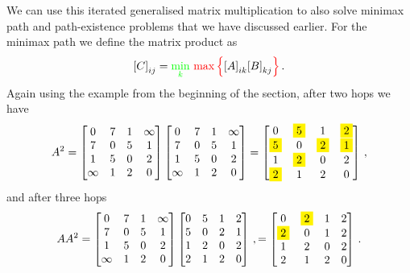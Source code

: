 We can use this iterated generalised matrix multiplication to also
solve minimax path and path-existence problems that we have discussed
earlier. For the minimax path we define the matrix product as
\begin{equation*}
  {[C]}_{ij} = {\color{green}\min_k}\ {\color{red}\max\Big\{}{[A]}_{ik} {[B]}_{kj}{\color{red}\Big\}}\,.
\end{equation*}
Again using the example from the beginning of the section, after two
hops we have
\begin{equation*}
  A^2 =
  \begin{bmatrix}    
    0 & 7 & 1 & \infty \\
    7 & 0 & 5 & 1 \\
    1 & 5 & 0 & 2 \\
    \infty & 1 & 2 & 0
  \end{bmatrix}
  \begin{bmatrix}    
    0 & 7 & 1 & \infty \\
    7 & 0 & 5 & 1 \\
    1 & 5 & 0 & 2 \\
    \infty & 1 & 2 & 0
  \end{bmatrix}
  =
  \begin{bmatrix}    
    0 & \colorbox{yellow}{5} & 1 & \colorbox{yellow}{2} \\
    \colorbox{yellow}{5} & 0 & \colorbox{yellow}{2} & \colorbox{yellow}{1} \\
    1 & \colorbox{yellow}{2} & 0 & 2 \\
    \colorbox{yellow}{2} & 1 & 2 & 0
  \end{bmatrix}\,,
\end{equation*}
and after three hops
\begin{equation*}
  AA^2 =
  \begin{bmatrix}    
    0 & 7 & 1 & \infty \\
    7 & 0 & 5 & 1 \\
    1 & 5 & 0 & 2 \\
    \infty & 1 & 2 & 0
  \end{bmatrix}
  \begin{bmatrix}    
    0 & {5} & 1 & {2} \\
    {5} & 0 & {2} & {1} \\
    1 & {2} & 0 & 2 \\
    {2} & 1 & 2 & 0
  \end{bmatrix}\,, =
  \begin{bmatrix}    
    0 & \colorbox{yellow}{2} & 1 & 2 \\
    \colorbox{yellow}{2} & 0 & {1} & {2} \\
    1 & {2} & 0 & 2 \\
    {2} & 1 & 2 & 0
  \end{bmatrix}\,.
\end{equation*}
